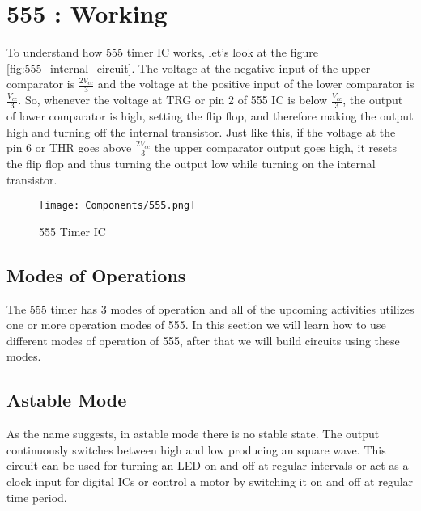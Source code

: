 \section{555 : Working}
To understand how 555 timer IC works, let's look at the figure \ref{fig:555_internal_circuit}. The voltage at the negative input of 
the upper comparator is $\frac{2V_{cc}}{3}$ and the voltage at the positive input of the lower comparator is $\frac{V_{cc}}{3}$. 
So, whenever the voltage at TRG or pin 2 of 555 IC is below $\frac{V_{cc}}{3}$, the output of lower comparator is high, setting 
the flip flop, and therefore making the output high and turning off the internal transistor. Just like this, if the voltage at 
the pin 6 or THR goes above $\frac{2V_{cc}}{3}$ the upper comparator output goes high, it resets the flip flop and thus turning 
the output low while turning on the internal transistor.
\begin{figure}[!ht]
    \centering
    \texttt{[image: Components/555.png]}
    \caption{555 Timer IC}
    \label{fig:555_code}
\end{figure}
\subsection{Modes of Operations}
The 555 timer has 3 modes of operation and all of the upcoming activities utilizes one or more operation modes of 555.
In this section we will learn how to use different modes of operation of 555, after that we will build circuits using these modes.
\subsection{Astable Mode}\label{astablemode}
As the name suggests, in astable mode there is no stable state. The output continuously switches between high and low producing an
square wave. This circuit can be used for turning an LED on and off at regular intervals or act as a clock input for digital ICs
or control a motor by switching it on and off at regular time period.
